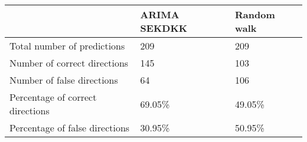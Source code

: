 \begin{tabular}{lll}
\hline
                                  & ARIMA SEKDKK   & Random walk   \\
\hline
 Total number of predictions      & 209            & 209           \\
 Number of correct directions     & 145            & 103           \\
 Number of false directions       & 64             & 106           \\
 Percentage of correct directions & 69.05\%         & 49.05\%        \\
 Percentage of false directions   & 30.95\%         & 50.95\%        \\
\hline
\end{tabular}